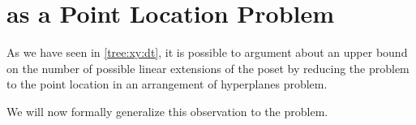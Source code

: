 \chapter{\kSUM as a Point Location Problem}

As we have seen in \ref{tree:xy:dt}, it is possible to argument about an upper
bound on the number of possible linear extensions of the poset \XY by
reducing the problem to the point location in an
arrangement of hyperplanes problem.

We will now formally generalize this observation to the \kSUM problem.
